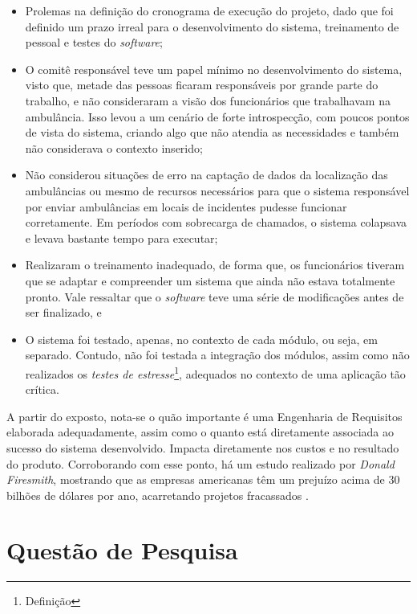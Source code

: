 \begin{itemize}
    \item Prolemas na definição do cronograma de execução do projeto, dado que foi definido um prazo irreal para o desenvolvimento do sistema, treinamento de pessoal e testes do \textit{software};
    
    \item O comitê responsável teve um papel mínimo no desenvolvimento do sistema, visto que, metade das pessoas ficaram responsáveis por grande parte do trabalho, e não consideraram a visão dos funcionários que trabalhavam na ambulância. Isso levou a um cenário de forte introspecção, com poucos pontos de vista do sistema, criando algo que não atendia as necessidades e também não considerava o contexto inserido;
    
    \item Não considerou situações de erro na captação de dados da localização das ambulâncias ou mesmo de recursos necessários para que o sistema responsável por enviar ambulâncias em locais de incidentes pudesse funcionar corretamente. Em períodos com sobrecarga de chamados, o sistema colapsava e levava bastante tempo para executar;
    
    \item Realizaram o treinamento inadequado, de forma que, os funcionários tiveram que se adaptar e compreender um sistema que ainda não estava totalmente pronto. Vale ressaltar que o \textit{software} teve uma série de modificações antes de ser finalizado, e
    
    \item O sistema foi testado, apenas, no contexto de cada módulo, ou seja, em separado. Contudo, não foi testada a integração dos módulos, assim como não realizados os \textit{testes de estresse}\footnote{Definição}, adequados no contexto de uma aplicação tão crítica.
\end{itemize}

A partir do exposto, nota-se o quão importante é uma Engenharia de Requisitos elaborada adequadamente, assim como o quanto está diretamente associada ao sucesso do sistema desenvolvido. Impacta diretamente nos custos e no resultado do produto. Corroborando com esse ponto, há um estudo realizado por \textit{Donald Firesmith}, mostrando que as empresas americanas têm um prejuízo acima de 30 bilhões de dólares por ano, acarretando projetos fracassados \cite{king2008cost}.

\section{Questão de Pesquisa}

